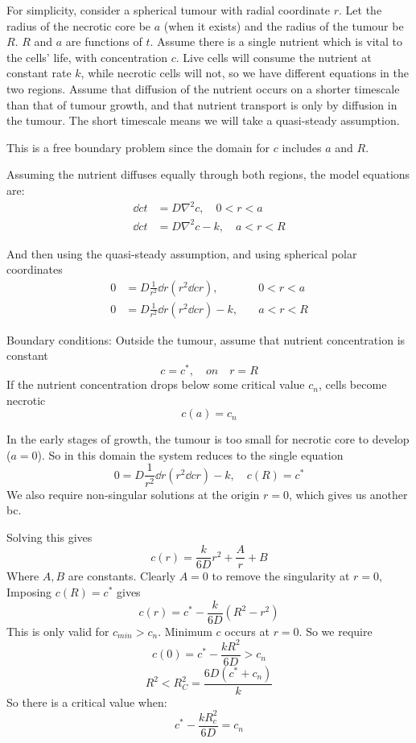 \documentclass{X:/Documents/Coding/Latex/myassignment}
\begin{document}
For simplicity, consider a spherical tumour with radial coordinate $r$. Let the radius of the necrotic core be $a$ (when it exists) and the radius of the tumour be $R$. $R$ and $a$ are functions of $t$. Assume there is a single nutrient which is vital to the cells' life, with concentration $c$. Live cells will consume the nutrient at constant rate $k$, while necrotic cells will not, so we have different equations in the two regions. Assume that diffusion of the nutrient occurs on a shorter timescale than that of tumour growth, and that nutrient transport is only by diffusion in the tumour. The short timescale means we will take a quasi-steady assumption.

This is a free boundary problem since the domain for $c$ includes $a$ and $R$.

Assuming the nutrient diffuses equally through both regions, the model equations are:
\begin{align*}
	\dd ct &= D\nabla^2 c , \quad 0<r<a\\
	\dd ct &= D\nabla^2 c - k, \quad a<r<R
\end{align*}

And then using the quasi-steady assumption, and using spherical polar coordinates
\begin{align*}
	0 &= D\frac1{r^2} \dd{}r \left(r^2 \dd cr\right),& \quad 0<r<a\\
	0 &= D\frac1{r^2} \dd{}r \left(r^2 \dd cr\right) - k,& \quad a<r<R
\end{align*}

Boundary conditions:
Outside the tumour, assume that nutrient concentration is constant
\[c = c^*, \quad on\quad r=R\]
If the nutrient concentration drops below some critical value $c_n$, cells become necrotic
\[c(a) = c_n\]



In the early stages of growth, the tumour is too small for necrotic core to develop ($a=0$).
So in this domain the system reduces to the single equation
\[0 = D\frac1{r^2} \dd{}r \left(r^2 \dd cr\right) - k, \quad c(R)=c^*\]
We also require non-singular solutions at the origin $r=0$, which gives us another bc.

Solving this gives
\[c(r) = \frac{k}{6D} r^2 + \frac{A}{r} + B\]
Where $A,B$ are constants. Clearly $A=0$ to remove the singularity at $r=0$, 
Imposing $c(R) = c^*$ gives
\[c(r) = c^* - \frac{k}{6D}(R^2-r^2)\]
This is only valid for $c_{min} > c_n$.
Minimum $c$ occurs at $r=0$. So we require
\[c(0) = c^* - \frac{kR^2}{6D} > c_n\]
\[R^2 < R_C^2 = \frac{6D(c^* + c_n)}{k}\]
So there is a critical value when:
\[c^* - \frac{kR_c^2}{6D} = c_n\]
\end{document}

